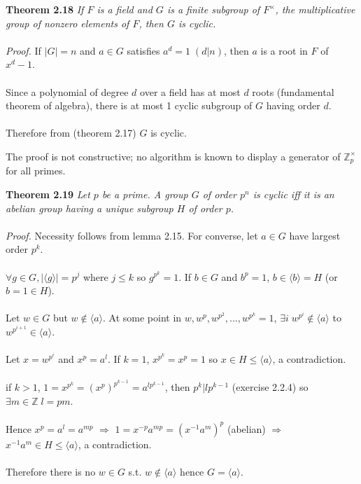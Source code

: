 \documentclass{article}
\begin{document}
\begin{redrules}\color{red}
\textbf{Theorem 2.18} \textit{If \(F\) is a field and \(G\) is a finite subgroup of \(F^{\times}\), the multiplicative group of nonzero elements of \(F\), then \(G\) is cyclic.}\\\\\color{black}
\textit{Proof.} If \(|G|=n\) and \(a\in G\) satisfies \(a^{d}=1\;(d|n)\), then \(a\) is a root in \(F\) of \(x^{d}-1\).\\\\
Since a polynomial of degree \(d\) over a field has at most \(d\) roots (fundamental theorem of algebra), there is at most 1 cyclic subgroup of \(G\) having order \(d\).\\\\
Therefore from \color{gray}(theorem 2.17) \color{black} \(G\) is cyclic.
\end{redrules}
The proof is not constructive; no algorithm is known to display a generator of \(\mathbb{Z}^{\times}_{p}\) for all primes.
\begin{redrules}\color{red}
\textbf{Theorem 2.19} \textit{Let \(p\) be a prime. A group \(G\) of order \(p^{n}\) is cyclic iff it is an abelian group having a unique subgroup \(H\) of order \(p\).}\\\\\color{black}
\textit{Proof.} Necessity follows from \color{gray}lemma 2.15\color{black}. For converse, let \(a\in G\) have largest order \(p^{k}\).\\\\
\(\forall g\in G, |\langle g\rangle|=p^{j}\) where \(j\le k\) so \(g^{p^{k}}=1\). If \(b\in G\) and \(b^{p}=1\), \(b\in \langle b\rangle = H\) (or \(b=1\in H\)).\\\\
Let \(w\in G\) but \(w\notin \langle a\rangle \). At some point in \(w, w^{p}, w^{p^{2}},...,w^{p^{k}}=1\), \(\exists i\;w^{p^{i}}\notin \langle a\rangle \) to \(w^{p^{i+1}}\in \langle a\rangle \).\\\\
Let \(x=w^{p^{i}}\) and \(x^{p}=a^{l}\). If \(k=1\), \(x^{p^{k}}=x^{p}=1\) so \(x\in H\le\langle a\rangle \), a contradiction.\\\\
if \(k>1\), \(1=x^{p^{k}}=(x^{p})^{p^{k-1}}=a^{lp^{k-1}}\), then \(p^{k}|lp^{k-1}\) \color{gray}(exercise 2.2.4) \color{black} so \(\exists m\in\mathbb{Z}\;l=pm\).\\\\
Hence \(x^{p}=a^{l}=a^{mp}\) \(\Longrightarrow\) \(1=x^{-p}a^{mp}=(x^{-1}a^{m})^{p}\) (abelian) \(\Longrightarrow\) \(x^{-1}a^{m}\in H\le \langle a\rangle \), a contradiction.\\\\
Therefore there is no \(w\in G\) s.t. \(w\notin \langle a\rangle \) hence \(G=\langle a\rangle \).
\end{redrules}
\end{document}
